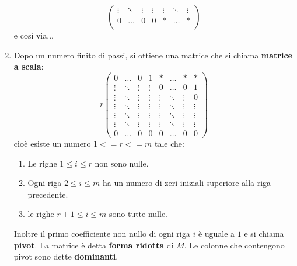 \documentclass[a4paper]{article}
\theoremstyle{break}
\theoremstyle{break}
\theoremstyle{break}
\theoremstyle{break}
\begin{document}
\begin{enumerate}
\[\begin{pmatrix}
      \vdots & \ddots & \vdots & \vdots & \vdots & \ddots & \vdots \\
      0 & \ldots & 0 & 0 & * & \ldots & * \\
    \end{pmatrix}
    \] 
    e così via...
  \item Dopo un numero finito di passi, si ottiene una matrice che si chiama
    \textbf{matrice a scala}:
    \label{D3}
    \[
    r\begin{pmatrix} 
      0 & \ldots & 0 & 1 & * & \ldots & * & * \\
      \vdots & \ddots & \vdots & \vdots & 0 & \ldots & 0 & 1 \\
      \vdots & \ddots & \vdots & \vdots & \vdots & \ddots & \vdots & 0 \\
      \vdots & \ddots & \vdots & \vdots & \vdots & \ddots & \vdots & \vdots\\
      \vdots & \ddots & \vdots & \vdots & \vdots & \ddots & \vdots & \vdots\\
      \vdots & \ddots & \vdots & \vdots & \vdots & \ddots & \vdots & \vdots \\
      0 & \ldots & 0 & 0 & 0 & \ldots & 0 & 0
    \end{pmatrix}
    \] 
    cioè esiste un numero \( 1<=r<=m \) tale che:
    \begin{enumerate}
      \item Le righe \( 1 \le i \le r \) non sono nulle.
      \item Ogni riga \( 2 \le i \le m \) ha un numero di zeri iniziali superiore alla
        riga precedente.
      \item le righe \( r+1 \le i \le m \) sono tutte nulle.
    \end{enumerate}
    Inoltre il primo coefficiente non nullo di ogni riga \( i \) è uguale a \( 1 \) e si chiama \textbf{pivot}.
    La matrice è detta \textbf{forma ridotta} di \( M \). Le colonne che contengono pivot
    sono dette \textbf{dominanti}.
\end{enumerate}
  
\end{document}
